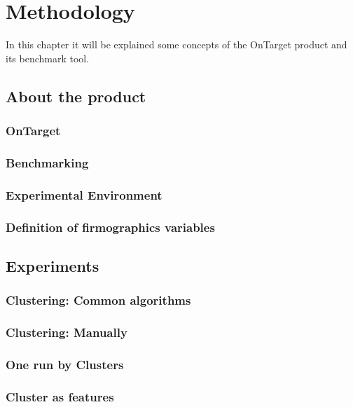 \chapter{Methodology}

In this chapter it will be explained some concepts of the OnTarget product and its benchmark tool.

\section{About the product}

\subsection{OnTarget}

\subsection{Benchmarking}

\subsection{Experimental Environment}

\subsection{Definition of firmographics variables}

\section{Experiments}

\subsection{Clustering: Common algorithms}

\subsection{Clustering: Manually}

\subsection{One run by Clusters}

\subsection{Cluster as features}
